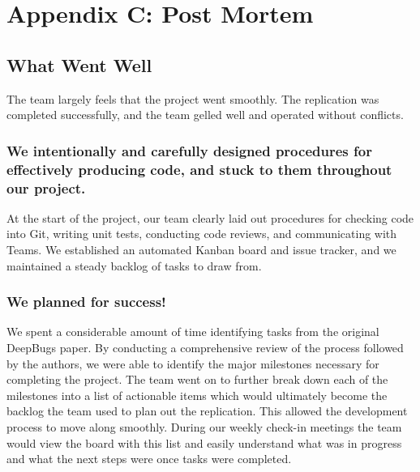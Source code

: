 
\section{Appendix C: Post Mortem}



\subsection{What Went Well}
The team largely feels that the project went smoothly. The replication was completed successfully, and the team gelled well and operated without conflicts.

\subsubsection{\textbf{We intentionally and carefully designed procedures for effectively producing code, and stuck to them throughout our project.}} At the start of the project, our team clearly laid out procedures for checking code into Git, writing unit tests, conducting code reviews, and communicating with Teams. We established an automated Kanban board and issue tracker, and we maintained a steady backlog of tasks to draw from.

\subsubsection{\textbf{We planned for success!}} We spent a considerable amount of time identifying tasks from the original DeepBugs paper. By conducting a comprehensive review of the process followed by the authors, we were able to identify the major milestones necessary for completing the project. The team went on to further break down each of the milestones into a list of actionable items which would ultimately become the backlog the team used to plan out the replication. This allowed the development process to move along smoothly. During our weekly check-in meetings the team would view the board with this list and easily understand what was in progress and what the next steps were once tasks were completed.

